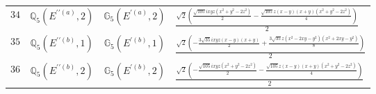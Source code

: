 \documentclass[fleqn,8pt,landscape]{jsarticle}
\begin{document}
\begin{table}[ht!]
\begin{center}
\begin{tabular}{cccl}
$ 34 $ & $ \mathbb{Q}_{5}(E^{\prime\prime(a)},2) $ & $ \mathbb{G}_{5}(E^{\prime(a)},2) $ & $ \frac{\sqrt{2} \left(\frac{\sqrt{105} i x y z \left(x^{2} + y^{2} - 2 z^{2}\right)}{2} - \frac{\sqrt{105} z \left(x - y\right) \left(x + y\right) \left(x^{2} + y^{2} - 2 z^{2}\right)}{4}\right)}{2} $ \\
$ 35 $ & $ \mathbb{Q}_{5}(E^{\prime\prime(b)},1) $ & $ \mathbb{G}_{5}(E^{\prime(b)},1) $ & $ \frac{\sqrt{2} \left(- \frac{3 \sqrt{35} i x y z \left(x - y\right) \left(x + y\right)}{2} + \frac{3 \sqrt{35} z \left(x^{2} - 2 x y - y^{2}\right) \left(x^{2} + 2 x y - y^{2}\right)}{8}\right)}{2} $ \\
$ 36 $ & $ \mathbb{Q}_{5}(E^{\prime\prime(b)},2) $ & $ \mathbb{G}_{5}(E^{\prime(b)},2) $ & $ \frac{\sqrt{2} \left(- \frac{\sqrt{105} i x y z \left(x^{2} + y^{2} - 2 z^{2}\right)}{2} - \frac{\sqrt{105} z \left(x - y\right) \left(x + y\right) \left(x^{2} + y^{2} - 2 z^{2}\right)}{4}\right)}{2} $ \\
 \hline \hline
\end{tabular}
\end{center}
\end{table}
\end{document}
